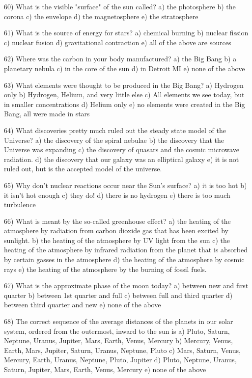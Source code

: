 60) What is the visible "surface" of the sun called?
a) the photosphere b) the corona c) the envelope d) the magnetosphere
e) the stratosphere

61) What is the source of energy for stars?
a) chemical burning b) nuclear fission c) nuclear fusion
d) gravitational contraction e) all of the above are sources

62) Where was the carbon in your body manufactured?
a) the Big Bang b) a planetary nebula c) in the core of the sun
d) in Detroit MI e) none of the above

63) What elements were thought to be produced in the Big Bang?
a) Hydrogen only
b) Hydrogen, Helium, and very little else
c) All elements we see today, but in smaller concentrations
d) Helium only
e) no elements were created in the Big Bang, all were made in stars

64) What discoveries pretty much ruled out the steady state model of the
Universe?
a) the discovery of the spiral nebulae
b) the discovery that the Universe was expanding
c) the discovery of quasars and the cosmic microwave radiation.
d) the discovery that our galaxy was an elliptical galaxy
e) it is not ruled out, but is the accepted model of the universe.

65) Why don't nuclear reactions occur near the Sun's surface?
a) it is too hot b) it isn't hot enough c) they do!
d) there is no hydrogen e) there is too much turbulence

66) What is meant by the so-called greenhouse effect?
a) the heating of the atmosphere by radiation from carbon dioxide
gas that has been excited by sunlight.
b) the heating of the atmosphere by UV light from the sun
c) the heating of the atmosphere by infrared radiation from the
planet that is absorbed by certain gasses in the atmosphere
d) the heating of the atmosphere by cosmic rays
e) the heating of the atmosphere by the burning of fossil fuels.

67) What is the approximate phase of the moon today?
a) between new and first quarter
b) between 1st quarter and full
c) between full and third quarter
d) between third quarter and new
e) none of the above

68) The correct sequence of the average distances of the planets in our solar
system, ordered from the outermost, inward to the sun is
a) Pluto, Saturn, Neptune, Uranus, Jupiter, Mars, Earth, Venus, Mercury
b) Mercury, Venus, Earth, Mars, Jupiter, Saturn, Uranus, Neptune, Pluto
c) Mars, Saturn, Venus, Mercury, Earth, Uranus, Neptune, Pluto, Jupiter
d) Pluto, Neptune, Uranus, Saturn, Jupiter, Mars, Earth, Venus, Mercury
e) none of the above

